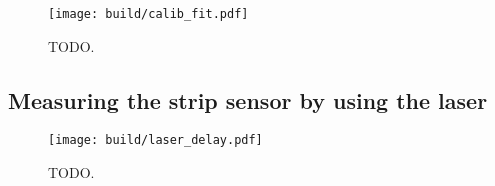 \begin{figure}[H]
  \centering
  \texttt{[image: build/calib\_fit.pdf]}
  \caption{TODO.}
  \label{fig:calib_fit}
\end{figure}

\subsection{Measuring the strip sensor by using the laser}

\begin{figure}[H]
  \centering
  \texttt{[image: build/laser\_delay.pdf]}
  \caption{TODO.}
  \label{fig:laser_delay}
\end{figure}